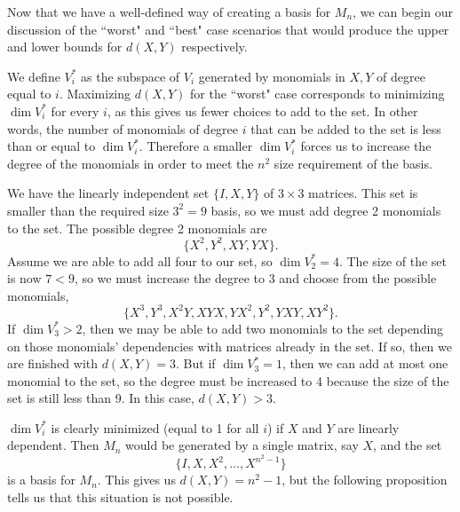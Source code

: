 Now that we have a well-defined way of creating a basis for $M_n$, we can begin our discussion of the ``worst" and ``best" case scenarios that would produce the upper and lower bounds for $d(X,Y)$ respectively. 

We define $V^*_i$ as the subspace of $V_i$ generated by monomials in $X,Y$ of degree equal to $i$. Maximizing $d(X,Y)$ for the ``worst" case corresponds to minimizing $\dim V^*_i$ for every $i$, as this gives us fewer choices to add to the set. In other words, the number of monomials of degree $i$ that can be added to the set is less than or equal to $\dim V^*_i$. Therefore a smaller $\dim V^*_i$ forces us to increase the degree of the monomials in order to meet the $n^2$ size requirement of the basis. 
\begin{example}
We have the linearly independent set $\{I,X,Y\}$ of $3\times3$ matrices. This set is smaller than the required size $3^2=9$ basis, so we must add degree 2 monomials to the set. The possible degree 2 monomials are $$\{X^2,Y^2,XY,YX\}.$$ Assume we are able to add all four to our set, so $\dim V^*_2=4$. The size of the set is now $7<9$, so we must increase the degree to 3 and choose from the possible monomials, $$\{X^3,Y^3,X^2Y,XYX,YX^2,Y^2,YXY,XY^2\}.$$ If $\dim V^*_3>2$, then we may be able to add two monomials to the set depending on those monomials' dependencies with matrices already in the set. If so, then we are finished with $d(X,Y)=3$. But if $\dim V^*_3=1$, then we can add at most one monomial to the set, so the degree must be increased to 4 because the size of the set is still less than 9. In this case, $d(X,Y)>3$.  
\end{example}
$\dim V^*_i$ is clearly minimized (equal to 1 for all $i$) if $X$ and $Y$ are linearly dependent. Then $M_n$ would be generated by a single matrix, say $X$, and the set $$\{I,X,X^2,\ldots,X^{n^2-1}\}$$ is a basis for $M_n$. This gives us $d(X,Y)=n^2-1$, but the following proposition tells us that this situation is not possible. 


